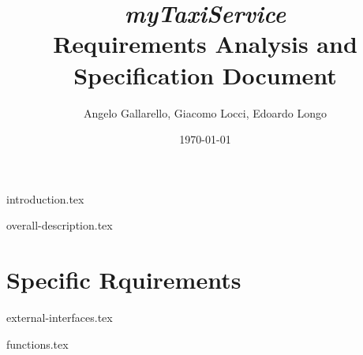 \documentclass[12pt, a4paper]{article}
\begin{document}
\title{ \emph{ myTaxiService}\\ Requirements Analysis and Specification Document }

\author{Angelo Gallarello, Giacomo Locci, Edoardo Longo}
\date{\today}
\maketitle

\newpage

\tableofcontents

\newpage


{introduction.tex}

{overall-description.tex}

\section{Specific Rquirements} %
\label{sec:specific_rquirements}

{external-interfaces.tex}

{functions.tex}

\end{document}
